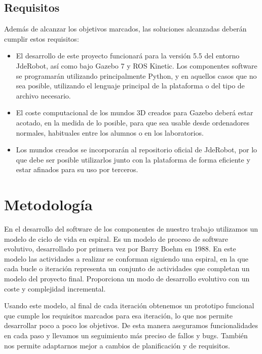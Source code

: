 \subsection{Requisitos}
\label{subsec:obj_requisitos}
 Además de alcanzar los objetivos marcados, las soluciones alcanzadas deberán cumplir estos requisitos:
\begin{itemize}
	\item El desarrollo de este proyecto funcionará para la versión 5.5 del entorno JdeRobot, así como bajo Gazebo 7 y ROS Kinetic. Los componentes software se programarán utilizando principalmente Python, y en aquellos casos que no sea posible, utilizando el lenguaje principal de la plataforma o del tipo de archivo necesario.
	
	\item El coste computacional de los mundos 3D creados para Gazebo deberá estar acotado, en la medida de lo posible, para que sea usable desde ordenadores normales, habituales entre los alumnos o en los laboratorios. 
	
	\item Los mundos creados se incorporarán al repositorio oficial de JdeRobot, por lo que debe ser posible utilizarlos junto con la plataforma de forma eficiente y estar afinados para su uso por terceros.

\end{itemize}

\section{Metodología}
\label{sec:obj_metodologia}


En el desarrollo del software de los componentes de nuestro trabajo utilizamos un  modelo de ciclo de vida en espiral. Es un modelo de proceso de software evolutivo, desarrollado por primera vez por Barry Boehm en 1988. En este modelo las actividades a realizar se conforman siguiendo una espiral, en la que cada bucle o iteración representa un conjunto de actividades que completan un modelo del proyecto final. Proporciona un modo de desarrollo evolutivo con un coste y complejidad incremental. 

Usando este modelo, al final de cada iteración obtenemos un prototipo funcional que cumple los requisitos marcados para esa iteración, lo que nos permite desarrollar poco a poco los objetivos. De esta manera aseguramos funcionalidades en cada paso y llevamos un seguimiento más preciso de fallos y bugs. También nos permite adaptarnos mejor a cambios de planificación y de requisitos.

